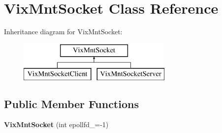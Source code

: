 \hypertarget{class_vix_mnt_socket}{}\section{Vix\+Mnt\+Socket Class Reference}
\label{class_vix_mnt_socket}
Inheritance diagram for Vix\+Mnt\+Socket\+:\begin{figure}[H]
\begin{center}
\leavevmode
\includegraphics[height=2.000000cm]{class_vix_mnt_socket}
\end{center}
\end{figure}
\subsection*{Public Member Functions}
\begin{DoxyCompactItemize}
\item 
\hypertarget{class_vix_mnt_socket_a00ea7c838e653815f65242728bed91d4}{}\label{class_vix_mnt_socket_a00ea7c838e653815f65242728bed91d4} 
{\bfseries Vix\+Mnt\+Socket} (int epollfd\+\_\+=-\/1)
\end{DoxyCompactItemize}
